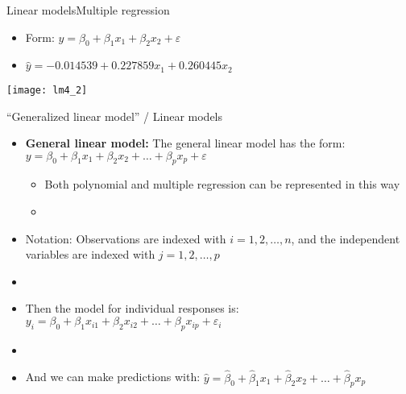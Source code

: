 \documentclass[xcolor=dvipsnames]{beamer}
\begin{document}
\begin{frame}{Linear models}{Multiple regression}
	\begin{itemize}
		\item Form: $y = \beta_0 + \beta_1 x_1 + \beta_2 x_2 + \varepsilon$
		\item $\hat{y} = -0.014539 +0.227859 x_1 + 0.260445  x_2 $
	\end{itemize}
	\vspace{-1.5mm}
	\begin{center}
		\texttt{[image: lm4\_2]}
	\end{center}
\end{frame}

\begin{frame}{``Generalized linear model'' / Linear models}
	\begin{itemize}
		\item \textbf{General linear model:} The general linear model has the form: $y = \beta_0 + \beta_1 x_1 + \beta_2 x_2 + \hdots + \beta_p x_p + \varepsilon$
		\begin{itemize}
			\item Both polynomial and multiple regression can be represented in this way
			\item[]
		\end{itemize}
		\item Notation: Observations are indexed with $i = 1, 2, \hdots, n$, and the independent variables are indexed with $j = 1, 2, \hdots, p$
		\item[]
		\item Then the model for individual responses is: $y_i = \beta_0 + \beta_1 x_{i1} + \beta_2 x_{i2} + \hdots + \beta_p x_{ip} + \varepsilon_i$
		\item[]
		\item And we can make predictions with: $\hat{y} = \hat{\beta}_0 + \hat{\beta}_1 x_1 + \hat{\beta}_2 x_2 + \hdots + \hat{\beta}_p x_p $
	\end{itemize}
\end{frame}
\end{document}
